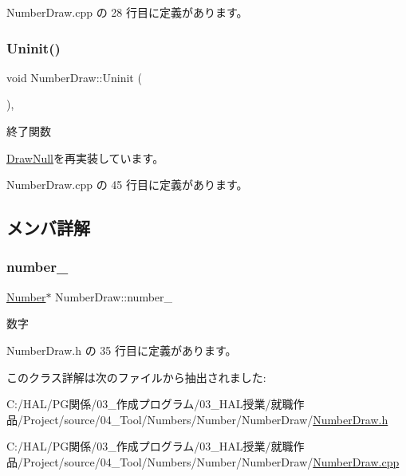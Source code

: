  Number\+Draw.\+cpp の 28 行目に定義があります。

\mbox{\label{class_number_draw_a2b203d101f23f0d3f584937ff5ad662a}} 
\subsubsection{\texorpdfstring{Uninit()}{Uninit()}}
{\footnotesize\ttfamily void Number\+Draw\+::\+Uninit (\begin{DoxyParamCaption}{ }\end{DoxyParamCaption})\hspace{0.3cm}{\ttfamily [override]}, {\ttfamily [virtual]}}



終了関数 



\mbox{\hyperlink{class_draw_null_a12d44e341c7364b5ab9cdd661dc16187}{Draw\+Null}}を再実装しています。



 Number\+Draw.\+cpp の 45 行目に定義があります。



\subsection{メンバ詳解}
\mbox{\label{class_number_draw_a8063f58804542a7f86b341eec4cc1e60}} 
\subsubsection{\texorpdfstring{number\+\_\+}{number\_}}
{\footnotesize\ttfamily \mbox{\hyperlink{class_number}{Number}}$\ast$ Number\+Draw\+::number\+\_\+\hspace{0.3cm}{\ttfamily [private]}}



数字 



 Number\+Draw.\+h の 35 行目に定義があります。



このクラス詳解は次のファイルから抽出されました\+:\begin{DoxyCompactItemize}
\item 
C\+:/\+H\+A\+L/\+P\+G関係/03\+\_\+作成プログラム/03\+\_\+\+H\+A\+L授業/就職作品/\+Project/source/04\+\_\+\+Tool/\+Numbers/\+Number/\+Number\+Draw/\mbox{\hyperlink{_number_draw_8h}{Number\+Draw.\+h}}\item 
C\+:/\+H\+A\+L/\+P\+G関係/03\+\_\+作成プログラム/03\+\_\+\+H\+A\+L授業/就職作品/\+Project/source/04\+\_\+\+Tool/\+Numbers/\+Number/\+Number\+Draw/\mbox{\hyperlink{_number_draw_8cpp}{Number\+Draw.\+cpp}}\end{DoxyCompactItemize}
